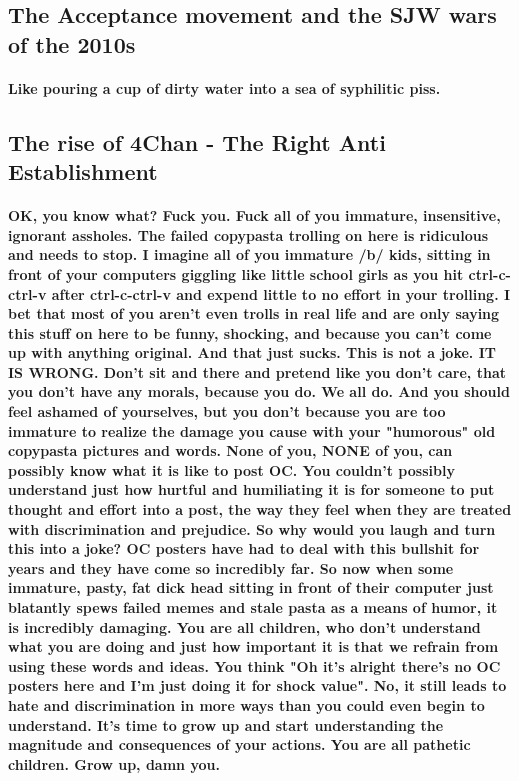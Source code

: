 \documentclass[a4paper,12pt]{article}
\begin{document}
	\subsection{The Acceptance movement and the SJW wars of the 2010s}
	\paragraph{Like pouring a cup of dirty water into a sea of syphilitic piss.}
	\subsection{The rise of 4Chan - The Right Anti Establishment}
	\paragraph{OK, you know what? Fuck you. Fuck all of you immature, insensitive, ignorant assholes. The failed copypasta trolling on here is ridiculous and needs to stop. I imagine all of you immature /b/ kids, sitting in front of your computers giggling like little school girls as you hit ctrl-c-ctrl-v after ctrl-c-ctrl-v and expend little to no effort in your trolling. I bet that most of you aren't even trolls in real life and are only saying this stuff on here to be funny, shocking, and because you can't come up with anything original. And that just sucks. This is not a joke. IT IS WRONG. Don't sit and there and pretend like you don't care, that you don't have any morals, because you do. We all do. And you should feel ashamed of yourselves, but you don't because you are too immature to realize the damage you cause with your "humorous" old copypasta pictures and words. None of you, NONE of you, can possibly know what it is like to post OC. You couldn't possibly understand just how hurtful and humiliating it is for someone to put thought and effort into a post, the way they feel when they are treated with discrimination and prejudice. So why would you laugh and turn this into a joke? OC posters have had to deal with this bullshit for years and they have come so incredibly far. So now when some immature, pasty, fat dick head sitting in front of their computer just blatantly spews failed memes and stale pasta as a means of humor, it is incredibly damaging. You are all children, who don't understand what you are doing and just how important it is that we refrain from using these words and ideas. You think "Oh it's alright there's no OC posters here and I'm just doing it for shock value". No, it still leads to hate and discrimination in more ways than you could even begin to understand. It's time to grow up and start understanding the magnitude and consequences of your actions. You are all pathetic children. Grow up, damn you.}
	
	\cite{Anon2022,ThePainter1939,Kek2012,Boomerboi1950}
	
	
	
	
	

	
\end{document}
